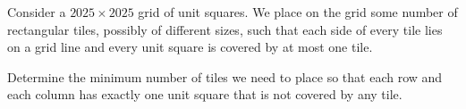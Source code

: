 Consider a $2025\times2025$ grid of unit squares. We place on the grid some number of rectangular tiles, possibly of different sizes, such that each side of every tile lies on a grid line and every unit square is covered by at most one tile.

Determine the minimum number of tiles we need to place so that each row and each column has exactly one unit square that is not covered by any tile.
